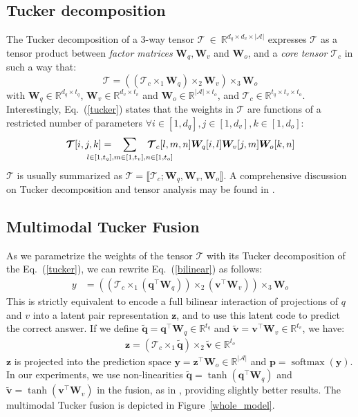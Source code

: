 \documentclass[10pt,twocolumn,letterpaper]{article}
\DeclareMathOperator{\softmax}{softmax}
\newcommand{\tens}[1]{
\bm{\mathcal{#1}}
}
\newcommand{\mat}[1]{\bm{#1}}
\newcommand{\p}{\mathbf{p}}
\newcommand{\q}{\mathbf{q}}
\newcommand{\vv}{\mathbf{v}}
\newcommand{\z}{\mathbf{z}}
\newcommand{\y}{\mathbf{y}}
\newcommand{\tq}{\mathbf{\tilde{q}}}
\newcommand{\tv}{\mathbf{\tilde{v}}}
\begin{document}
\subsection{Tucker decomposition}
The Tucker decomposition \cite{Tucker1966} of a 3-way tensor $\tens{T}~\in~\mathbb{R}^{d_q \times d_v \times |\mathcal{A}|}$ expresses $\tens{T}$ as a tensor product between \emph{factor matrices} $\mat{W}_q, \mat{W}_v$ and $\mat{W}_o$, and a \emph{core tensor} $\tens{T}_{c}$ in such a way that:
\begin{equation}
\tens{T} = \left( \left( \tens{T}_{c}\times_1 \mat{W}_q \right) \times_2 \mat{W}_v \right) \times_3 \mat{W}_o \label{tucker}
\end{equation}
with $\mat{W}_q \in \mathbb{R}^{d_q \times t_q}$, $\mat{W}_v \in \mathbb{R}^{d_v \times t_v}$ and $\mat{W}_o \in \mathbb{R}^{|\mathcal{A}| \times t_o}$, and $\tens{T}_c \in \mathbb{R}^{t_q \times t_v \times t_o}$. Interestingly, Eq.~(\ref{tucker}) states that the weights in $\tens{T}$ are functions of a restricted number of parameters $\forall i\in [1,d_q], j \in [1,d_v], k \in [1,d_o]$:
\vspace*{-0.3cm}
\begin{equation*}
\tens{T}[i,j,k] = \hspace{-1cm}\sum_{\substack{l \in [1,t_q], m \in [1,t_v], n \in [1,t_o]}} \hspace{-1cm}\tens{T}_c[l,m,n] \mat{W}_q[i,l] \mat{W}_v[j,m] \mat{W}_o[k,n]
\end{equation*}
$\tens{T}$ is usually summarized as $\tens{T} = \llbracket \tens{T}_c; \mat{W}_q,\mat{W}_v,\mat{W}_o \rrbracket$.
A comprehensive discussion on Tucker decomposition and tensor analysis may be found in \cite{Kolda:2009:TDA:1655228.1655230}.

\subsection{Multimodal Tucker Fusion} \label{mtf}
As we parametrize the weights of the tensor $\tens{T}$ with its Tucker decomposition of the Eq.~(\ref{tucker}), we can rewrite Eq.~(\ref{bilinear}) as follows:
\begin{align}
y &= \left( \left(\tens{T}_{c} \times_1 \left(\q^\top \mat{W}_q \right)\right) \times_2 \left(\vv^\top \mat{W}_v \right)\right) \times_3 \mat{W}_{o}
\end{align}
This is strictly equivalent to encode a full bilinear interaction of projections of $q$ and $v$ into a latent pair representation $\z$, and to use this latent code to predict the correct answer. If we define $\tq = \q^ \top \mat{W}_q \in \mathbb{R}^{t_q}$ and $\tv = \vv^ \top \mat{W}_v \in \mathbb{R}^{t_v}$, we have:
\begin{align} \label{core_bilinear}
\z = (\tens{T}_c \times_1 \tq) \times_2 \tv\in \mathbb{R}^{t_o} 
\end{align}
$\z$ is projected into the prediction space $\y = \z^\top\mat{W}_o \in \mathbb{R}^{|\mathcal{A}|}$ and $\p = \softmax(\y)$. In our experiments, we use non-linearities $\tq = \tanh(\q^\top \mat{W}_q)$ and $\tv = \tanh(\vv^\top \mat{W}_v)$ in the fusion, as in \cite{Kim2017}, providing slightly better results. The multimodal Tucker fusion is depicted in Figure~\ref{whole_model}.
\end{document}

